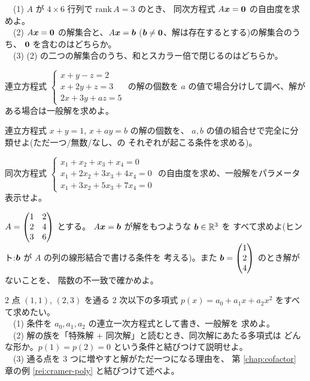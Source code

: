 \begin{mondai}[基本]\label{q:sol-ex4}
　(1) $A$ が $4 \times 6$ 行列で $\mathrm{rank}\,A = 3$ のとき、
同次方程式 $A\bm{x} = \bm{0}$ の自由度を求めよ。\\
　(2) $A\bm{x} = \bm{0}$ の解集合と、$A\bm{x} = \bm{b}$
($\bm{b} \neq \bm{0}$、解は存在するとする)の解集合のうち、
$\bm{0}$ を含むのはどちらか。\\
　(3) (2) の二つの解集合のうち、和とスカラー倍で閉じるのはどちらか。
\end{mondai}

\begin{mondai}[標準]\label{q:sol-ex5}
連立方程式
$\begin{cases}
x + y - z = 2 \\
x + 2y + z = 3 \\
2x + 3y + az = 5
\end{cases}$
の解の個数を $a$ の値で場合分けして調べ、解がある場合は一般解を求めよ。
\end{mondai}

\begin{mondai}[標準]\label{q:sol-ex6}
連立方程式 $x + y = 1$, $x + ay = b$ の解の個数を、
$a, b$ の値の組合せで完全に分類せよ(ただ一つ/無数/なし、の
それぞれが起こる条件を求める)。
\end{mondai}

\begin{mondai}[標準]\label{q:sol-ex7}
同次方程式
$\begin{cases}
x_1 + x_2 + x_3 + x_4 = 0 \\
x_1 + 2x_2 + 3x_3 + 4x_4 = 0 \\
x_1 + 3x_2 + 5x_3 + 7x_4 = 0
\end{cases}$
の自由度を求め、一般解をパラメータ表示せよ。
\end{mondai}

\begin{mondai}[標準]\label{q:sol-ex8}
$A = \begin{pmatrix}1 & 2 \\ 2 & 4 \\ 3 & 6\end{pmatrix}$ とする。
$A\bm{x} = \bm{b}$ が解をもつような $\bm{b} \in \mathbb{R}^3$ を
すべて求めよ(ヒント:$\bm{b}$ が $A$ の列の線形結合で書ける条件を
考える)。また $\bm{b} = \begin{pmatrix}1 \\ 2 \\ 4\end{pmatrix}$ のとき解がないことを、
階数の不一致で確かめよ。
\end{mondai}

\begin{mondai}[発展]\label{q:sol-ex9}
$2$ 点 $(1, 1)$, $(2, 3)$ を通る $2$ 次以下の多項式
$p(x) = a_0 + a_1 x + a_2 x^2$ をすべて求めたい。\\
　(1) 条件を $a_0, a_1, a_2$ の連立一次方程式として書き、一般解を
求めよ。\\
　(2) 解の族を「特殊解 $+$ 同次解」と読むとき、同次解にあたる多項式は
どんな形か。$p(1) = p(2) = 0$ という条件と結びつけて説明せよ。\\
　(3) 通る点を $3$ つに増やすと解がただ一つになる理由を、
第 \ref{chap:cofactor} 章の例 \ref{rei:cramer-poly} と結びつけて述べよ。
\end{mondai}

